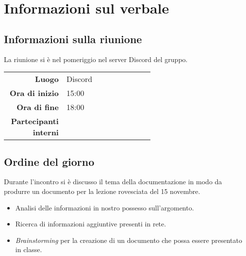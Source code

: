 \section{Informazioni sul verbale}

\subsection{Informazioni sulla riunione}
La riunione si è nel pomeriggio nel server Discord del gruppo.

\begin{center}
	\begin{tabular}{r|p{0.6\linewidth}}
		\toprule
		\textbf{Luogo} & Discord \\
		\textbf{Ora di inizio} & 15:00 \\
		\textbf{Ora di fine} & 18:00 \\
		\textbf{Partecipanti interni} & \groupTeam
	\end{tabular}
\end{center}

\medskip

\subsection{Ordine del giorno}
Durante l'incontro si è discusso il tema della documentazione in modo da produrre un documento per la lezione rovesciata del 15 novembre.
\begin{itemize}
	\item Analisi delle informazioni in nostro possesso sull'argomento.
	\item Ricerca di informazioni aggiuntive presenti in rete.
	\item \textit{Brainstorming} per la creazione di un documento che possa essere presentato in classe.
\end{itemize}
